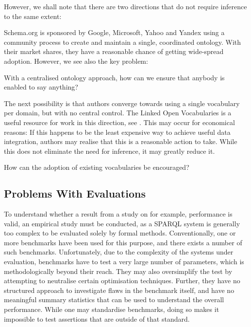 However, we shall note that there are two directions that do not
require inference to the same extent: 

Schema.org is sponsored by Google, Microsoft, Yahoo and Yandex using a
community process to create and maintain a single, coordinated
ontology. With their market shares, they have a reasonable chance of
getting wide-spread adoption. However, we see also the key problem:

\begin{problem}%
With a centralised ontology approach, how can we ensure that anybody is enabled to say
anything?
\end{problem}

The next possibility is that authors converge towards using a single
vocabulary per domain, but with no central control. The Linked Open
Vocabularies is a useful resource for work in this direction, see
\cite{lov2}. This may occur for economical reasons: If this happens to
be the least expensive way to achieve useful data integration, authors
may realise that this is a reasonable action to take. While this does
not eliminate the need for inference, it may greatly reduce it.

\begin{problem}%
How can the adoption of existing vocabularies be encouraged? 
\end{problem}


\subsection{Problems With Evaluations}\label{sec:evalproblems}

To understand whether a result from a study on for example,
performance is valid, an empirical study must be conducted, as a
SPARQL system is generally too complex to be evaluated solely by
formal methods. Conventionally, one or more benchmarks have been used
for this purpose, and there exists a number of such
benchmarks. Unfortunately, due to the complexity of the systems under
evaluation, benchmarks have to test a very large number of parameters,
which is methodologically beyond their reach. They may also
oversimplify the test by attempting to neutralise certain optimisation
techniques. Further, they have no structured approach to investigate
flaws in the benchmark itself, and have no meaningful summary
statistics that can be used to understand the overall
performance. While one may standardise benchmarks, doing so makes it
impossible to test assertions that are outside of that standard.

